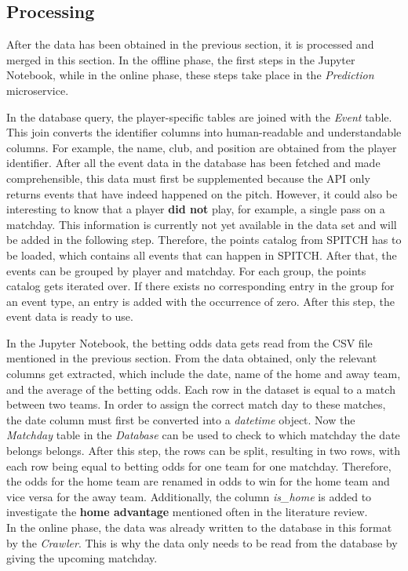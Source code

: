 \subsection{Processing}

After the data has been obtained in the previous section, it is processed and merged in this section. In the offline phase, the first steps in the Jupyter Notebook, while in the online phase, these steps take place in the \emph{Prediction} microservice. 

In the database query, the player-specific tables are joined with the \emph{Event} table. This join converts the identifier columns into human-readable and understandable columns. For example, the name, club, and position are obtained from the player identifier. After all the event data in the database has been fetched and made comprehensible, this data must first be supplemented because the API only returns events that have indeed happened on the pitch. However, it could also be interesting to know that a player \textbf{did not} play, for example, a single pass on a matchday. This information is currently not yet available in the data set and will be added in the following step. Therefore, the points catalog from SPITCH \parencite[see][]{spitch_points_2021} has to be loaded, which contains all events that can happen in SPITCH. After that, the events can be grouped by player and matchday. For each group, the points catalog gets iterated over. If there exists no corresponding entry in the group for an event type, an entry is added with the occurrence of zero. After this step, the event data is ready to use.

In the Jupyter Notebook, the betting odds data gets read from the CSV file mentioned in the previous section. From the data obtained, only the relevant columns get extracted, which include the date, name of the home and away team, and the average of the betting odds. Each row in the dataset is equal to a match between two teams. In order to assign the correct match day to these matches, the date column must first be converted into a \emph{datetime} object. Now the \emph{Matchday} table in the \emph{Database} can be used to check to which matchday the date belongs belongs. After this step, the rows can be split, resulting in two rows, with each row being equal to betting odds for one team for one matchday. Therefore, the odds for the home team are renamed in odds to win for the home team and vice versa for the away team. Additionally, the column \emph{is\_home} is added to investigate the \textbf{home advantage} mentioned often in the literature review. \\
In the online phase, the data was already written to the database in this format by the \emph{Crawler}. This is why the data only needs to be read from the database by giving the upcoming matchday.

